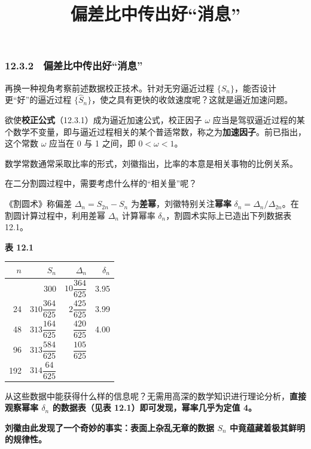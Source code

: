 \documentclass[
  10pt,
  fontset=fandol]{ctexart}
\title{偏差比中传出好``消息''}
\author{}
\date{}
\newcounter{none} %
\begin{document}
\maketitle

\subsubsection{12.3.2　偏差比中传出好``消息''}\label{ux504fux5deeux6bd4ux4e2dux4f20ux51faux597dux6d88ux606f}

再换一种视角考察前述数据校正技术。针对无穷逼近过程 \(\{S_n\}\)，能否设计更``好''的逼近过程 \(\{\widehat S_n\}\)，使之具有更快的收敛速度呢？这就是逼近加速问题。

欲使\textbf{校正公式}（12.3.1）成为逼近加速公式，校正因子 \(\omega\) 应当是驾驭逼近过程的某个数学不变量，即与逼近过程相关的某个普适常数，称之为\textbf{加速因子}。前已指出，这个常数 \(\omega\) 应当在 0 与 1 之间，即 \(0<\omega<1\)。

数学常数通常采取比率的形式，刘徽指出，比率的本意是相关事物的比例关系。

在二分割圆过程中，需要考虑什么样的``相关量''呢？

《割圆术》称偏差 \(\Delta_n=S_{2n}-S_n\) 为\textbf{差幂}，刘徽特别关注\textbf{幂率} \(\delta_n=\Delta_n/\Delta_{2n}\)。在割圆计算过程中，利用差幂 \(\Delta_n\) 计算幂率 \(\delta_n\)，割圆术实际上已造出下列数据表 12.1。

\textbf{表 12.1}

\begingroup
\renewcommand{\arraystretch}{2.2}

{\def\LTcaptype{none} %
\begin{longtable}[]{@{}rrrr@{}}
\toprule\noalign{}
\(n\) & \(S_n\) & \(\Delta_n\) & \(\delta_n\) \\
\midrule\noalign{}
\endhead
\bottomrule\noalign{}
\endlastfoot
12 & 300 & \(10\dfrac{364}{625}\) & 3.95 \\
24 & \(310\dfrac{364}{625}\) & \(2\dfrac{425}{625}\) & 3.99 \\
48 & \(313\dfrac{164}{625}\) & \(\dfrac{420}{625}\) & 4.00 \\
96 & \(313\dfrac{584}{625}\) & \(\dfrac{105}{625}\) & \\
192 & \(314\dfrac{64}{625}\) & & \\
\end{longtable}
}

\endgroup

从这些数据中能获得什么样的信息呢？无需用高深的数学知识进行理论分析，\textbf{直接观察幂率 \(\delta_n\) 的数据表（见表 12.1）即可发现，幂率几乎为定值 4。}

\textbf{刘徽由此发现了一个奇妙的事实：表面上杂乱无章的数据 \(S_n\) 中竟蕴藏着极其鲜明的规律性。}
\end{document}
